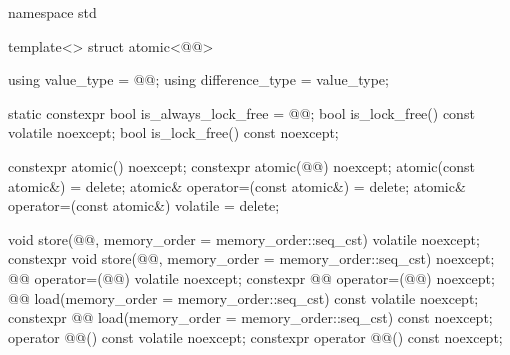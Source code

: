 \begin{codeblock}
namespace std {
  template<> struct atomic<@@> {
    using value_type = @@;
    using difference_type = value_type;

    static constexpr bool is_always_lock_free = @@;
    bool is_lock_free() const volatile noexcept;
    bool is_lock_free() const noexcept;

    constexpr atomic() noexcept;
    constexpr atomic(@@) noexcept;
    atomic(const atomic&) = delete;
    atomic& operator=(const atomic&) = delete;
    atomic& operator=(const atomic&) volatile = delete;

    void store(@@, memory_order = memory_order::seq_cst) volatile noexcept;
    constexpr void store(@@, memory_order = memory_order::seq_cst) noexcept;
    @@ operator=(@@) volatile noexcept;
    constexpr @@ operator=(@@) noexcept;
    @@ load(memory_order = memory_order::seq_cst) const volatile noexcept;
    constexpr @@ load(memory_order = memory_order::seq_cst) const noexcept;
    operator @@() const volatile noexcept;
    constexpr operator @@() const noexcept;

}}
\end{codeblock}
